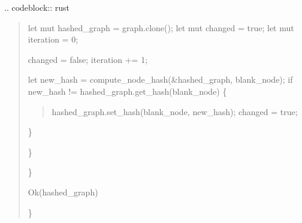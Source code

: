 \documentclass[letterpaper,10pt,english]{sphinxmanual}
\begin{document}
\sphinxAtStartPar
{}
.. code\sphinxhyphen{}block:: rust
\begin{quote}
\begin{description}
\sphinxAtStartPar
let mut hashed\_graph = graph.clone();
let mut changed = true;
let mut iteration = 0;
\begin{description}
\sphinxAtStartPar
changed = false;
iteration += 1;
\begin{description}
\sphinxAtStartPar
let new\_hash = compute\_node\_hash(\&hashed\_graph, blank\_node);
if new\_hash != hashed\_graph.get\_hash(blank\_node) \{
\begin{quote}

\sphinxAtStartPar
hashed\_graph.set\_hash(blank\_node, new\_hash);
changed = true;
\end{quote}

\sphinxAtStartPar
\}

\end{description}

\sphinxAtStartPar
\}

\end{description}

\sphinxAtStartPar
\}

\sphinxAtStartPar
Ok(hashed\_graph)

\end{description}

\sphinxAtStartPar
\}
\end{quote}
\end{document}
